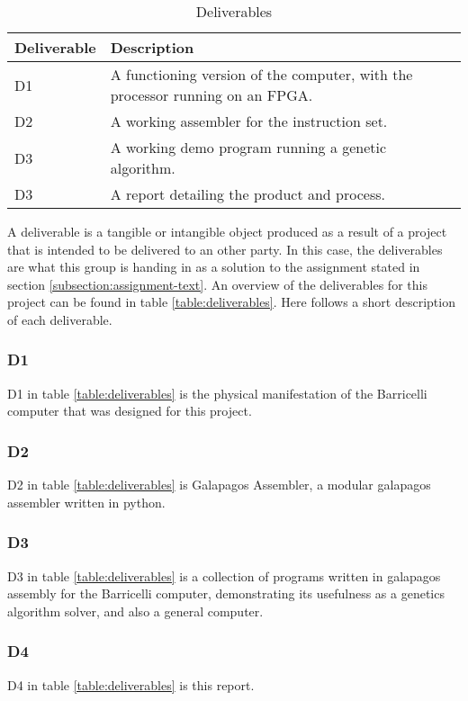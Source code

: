  \begin{table}[H]
 \begin{center}
 \begin{tabular}{| l | p{9cm} |}
 \hline
 Deliverable & Description \\
 \hline
 D1 & A functioning version of the computer, with the processor running on an FPGA.\\
 D2 & A working assembler for the instruction set.\\
 D3 & A working demo program running a genetic algorithm.\\
 D3 & A report detailing the product and process.\\
 \hline
 \end{tabular}
 \caption{Deliverables}
 \label{table:deliverables}
 \end{center}
 \end{table}

A deliverable is a tangible or intangible object produced as a result of a project that is intended to be delivered to an other party.
In this case, the deliverables are what this group is handing in as a solution to the assignment stated in section \vref{subsection:assignment-text}.
An overview of the deliverables for this project can be found in table \vref{table:deliverables}.
Here follows a short description of each deliverable.

\subsubsection{D1}

D1 in table \vref{table:deliverables} is the physical manifestation of the Barricelli computer that was designed for this project.

\subsubsection{D2}

D2 in table \vref{table:deliverables} is Galapagos Assembler, a modular \gls{galapagos} assembler written in python.

\subsubsection{D3}

D3 in table \vref{table:deliverables} is a collection of programs written in galapagos assembly for the Barricelli computer, demonstrating its usefulness as a genetics algorithm solver, and also a general computer.

\subsubsection{D4}

D4 in table \vref{table:deliverables} is this report.

